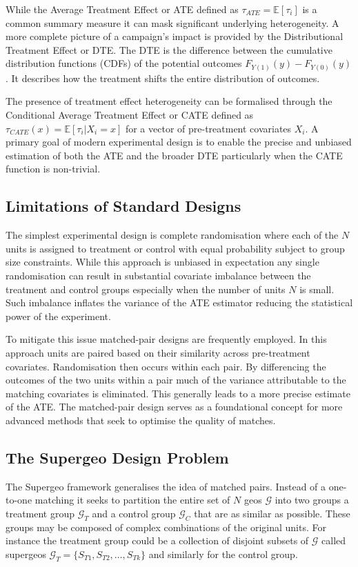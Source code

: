 \documentclass[final,3p,fleqn, 10pt]{elsarticle}
\begin{document}
    While the Average Treatment Effect or ATE defined as $\tau_{ATE} = \mathbb{E}[\tau_i]$ is a common summary measure it can mask significant underlying heterogeneity. A more complete picture of a campaign's impact is provided by the Distributional Treatment Effect or DTE. The DTE is the difference between the cumulative distribution functions (CDFs) of the potential outcomes $F_{Y(1)}(y) - F_{Y(0)}(y)$. It describes how the treatment shifts the entire distribution of outcomes.

    The presence of treatment effect heterogeneity can be formalised through the Conditional Average Treatment Effect or CATE defined as $\tau_{CATE}(x) = \mathbb{E}[\tau_i | X_i = x]$ for a vector of pre-treatment covariates $X_i$. A primary goal of modern experimental design is to enable the precise and unbiased estimation of both the ATE and the broader DTE particularly when the CATE function is non-trivial.

    \subsection{Limitations of Standard Designs}
    The simplest experimental design is complete randomisation where each of the $N$ units is assigned to treatment or control with equal probability subject to group size constraints. While this approach is unbiased in expectation any single randomisation can result in substantial covariate imbalance between the treatment and control groups especially when the number of units $N$ is small. Such imbalance inflates the variance of the ATE estimator reducing the statistical power of the experiment.

    To mitigate this issue matched-pair designs are frequently employed. In this approach units are paired based on their similarity across pre-treatment covariates. Randomisation then occurs within each pair. By differencing the outcomes of the two units within a pair much of the variance attributable to the matching covariates is eliminated. This generally leads to a more precise estimate of the ATE. The matched-pair design serves as a foundational concept for more advanced methods that seek to optimise the quality of matches.

    \subsection{The Supergeo Design Problem}
    The Supergeo framework generalises the idea of matched pairs. Instead of a one-to-one matching it seeks to partition the entire set of $N$ geos $\mathcal{G}$ into two groups a treatment group $\mathcal{G}_T$ and a control group $\mathcal{G}_C$ that are as similar as possible. These groups may be composed of complex combinations of the original units. For instance the treatment group could be a collection of disjoint subsets of $\mathcal{G}$ called supergeos $\mathcal{G}_T = \{S_{T1}, S_{T2}, \dots, S_{Tk}\}$ and similarly for the control group.
\end{document}

